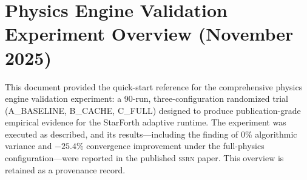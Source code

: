 
\section*{Physics Engine Validation Experiment Overview (November 2025)}

This document provided the quick-start reference for the comprehensive physics
engine validation experiment: a 90-run, three-configuration randomized trial
(A\_BASELINE, B\_CACHE, C\_FULL) designed to produce publication-grade
empirical evidence for the StarForth adaptive runtime. The experiment was
executed as described, and its results---including the finding of 0\%
algorithmic variance and \mbox{$-25.4\%$} convergence improvement under
the full-physics configuration---were reported in the published \textsc{ssrn}
paper. This overview is retained as a provenance record.
